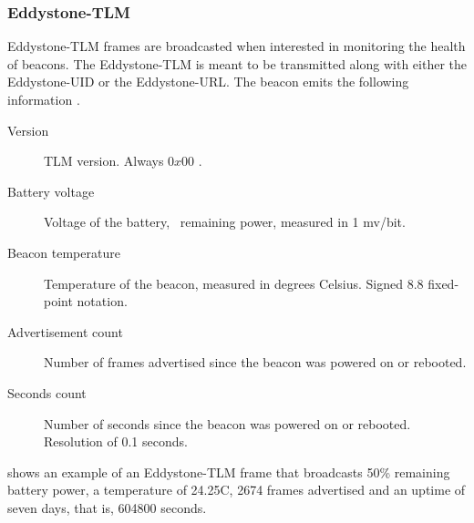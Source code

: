\subsubsection{Eddystone-TLM}

Eddystone-TLM frames are broadcasted when interested in monitoring the health of beacons. The Eddystone-TLM is meant to be transmitted along with either the Eddystone-UID or the Eddystone-URL. The beacon emits the following information \cite{eddystone:protocol-tlm-spec}.

\begin{description}
\item[Version] TLM version. Always $0x00$ \cite{eddystone:protocol-tlm-spec}.
\item[Battery voltage] Voltage of the battery, \ie~remaining power, measured in 1 mv/bit.
\item[Beacon temperature] Temperature of the beacon, measured in degrees Celsius. Signed 8.8 fixed-point notation.
\item[Advertisement count] Number of frames advertised since the beacon was powered on or rebooted.
\item[Seconds count] Number of seconds since the beacon was powered on or rebooted. Resolution of 0.1 seconds.
\end{description}

 shows an example of an Eddystone-TLM frame that broadcasts 50\% remaining battery power, a temperature of 24.25\degree C, 2674 frames advertised and an uptime of seven days, that is, 604800 seconds.


